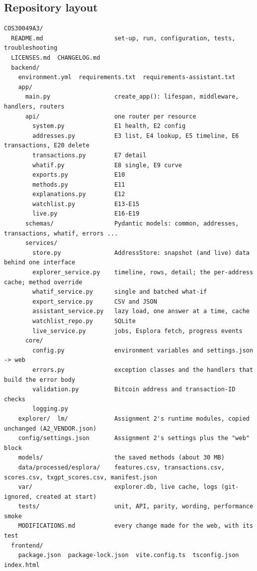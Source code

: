 \subsection{Repository layout}
\label{sec:layout}

\begin{lstlisting}
COS30049A3/
  README.md                    set-up, run, configuration, tests, troubleshooting
  LICENSES.md  CHANGELOG.md
  backend/
    environment.yml  requirements.txt  requirements-assistant.txt
    app/
      main.py                  create_app(): lifespan, middleware, handlers, routers
      api/                     one router per resource
        system.py              E1 health, E2 config
        addresses.py           E3 list, E4 lookup, E5 timeline, E6 transactions, E20 delete
        transactions.py        E7 detail
        whatif.py              E8 single, E9 curve
        exports.py             E10
        methods.py             E11
        explanations.py        E12
        watchlist.py           E13-E15
        live.py                E16-E19
      schemas/                 Pydantic models: common, addresses, transactions, whatif, errors ...
      services/
        store.py               AddressStore: snapshot (and live) data behind one interface
        explorer_service.py    timeline, rows, detail; the per-address cache; method override
        whatif_service.py      single and batched what-if
        export_service.py      CSV and JSON
        assistant_service.py   lazy load, one answer at a time, cache
        watchlist_repo.py      SQLite
        live_service.py        jobs, Esplora fetch, progress events
      core/
        config.py              environment variables and settings.json -> web
        errors.py              exception classes and the handlers that build the error body
        validation.py          Bitcoin address and transaction-ID checks
        logging.py
    explorer/  lm/             Assignment 2's runtime modules, copied unchanged (A2_VENDOR.json)
    config/settings.json       Assignment 2's settings plus the "web" block
    models/                    the saved methods (about 30 MB)
    data/processed/esplora/    features.csv, transactions.csv, scores.csv, txgpt_scores.csv, manifest.json
    var/                       explorer.db, live cache, logs (git-ignored, created at start)
    tests/                     unit, API, parity, wording, performance smoke
    MODIFICATIONS.md           every change made for the web, with its test
  frontend/
    package.json  package-lock.json  vite.config.ts  tsconfig.json  index.html

\end{lstlisting}
